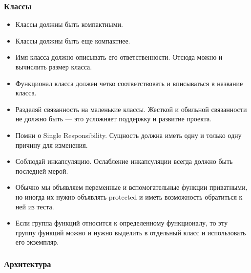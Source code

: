 \subsubsection{Классы}

\begin{itemize}
	\item Классы должны быть компактными.
	\item Классы должны быть еще компактнее.
	\item Имя класса должно описывать его ответственности. Отсюда можно и вычислить размер класса.
	\item Функционал класса должен четко соответствовать и вписываться в название класса.
	\item Разделяй связанность на маленькие классы. Жесткой и обильной связанности не должно быть — это усложняет поддержку и развитие проекта.
	\item Помни о Single Responsibility. Сущность должна иметь одну и только одну причину для изменения.
	\item Соблюдай инкапсуляцию. Ослабление инкапсуляции всегда должно быть последней мерой.
	\item Обычно мы объявляем переменные и вспомогательные функции приватными, но иногда их нужно объявлять protected и иметь возможность обратиться к ней из теста.
	\item Если группа функций относится к определенному функционалу, то эту группу функций можно и нужно выделить в отдельный класс и использовать его экземпляр.
\end{itemize}

\subsubsection{Архитектура}

